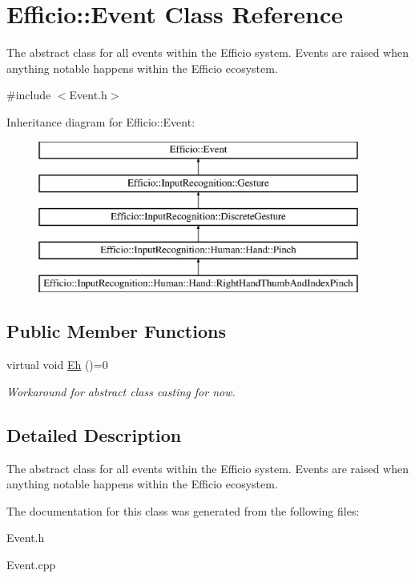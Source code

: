 \hypertarget{class_efficio_1_1_event}{}\section{Efficio\+:\+:Event Class Reference}
\label{class_efficio_1_1_event}


The abstract class for all events within the Efficio system. Events are raised when anything notable happens within the Efficio ecosystem.  




{\ttfamily \#include $<$Event.\+h$>$}

Inheritance diagram for Efficio\+:\+:Event\+:\begin{figure}[H]
\begin{center}
\leavevmode
\includegraphics[height=5.000000cm]{class_efficio_1_1_event}
\end{center}
\end{figure}
\subsection*{Public Member Functions}
\begin{DoxyCompactItemize}
\item 
virtual void \hyperlink{class_efficio_1_1_event_a88208c1d9df40670a57d12b54034b252}{Eh} ()=0\hypertarget{class_efficio_1_1_event_a88208c1d9df40670a57d12b54034b252}{}\label{class_efficio_1_1_event_a88208c1d9df40670a57d12b54034b252}

\begin{DoxyCompactList}\small\item\em Workaround for abstract class casting for now. \end{DoxyCompactList}\end{DoxyCompactItemize}


\subsection{Detailed Description}
The abstract class for all events within the Efficio system. Events are raised when anything notable happens within the Efficio ecosystem. 

The documentation for this class was generated from the following files\+:\begin{DoxyCompactItemize}
\item 
Event.\+h\item 
Event.\+cpp\end{DoxyCompactItemize}
